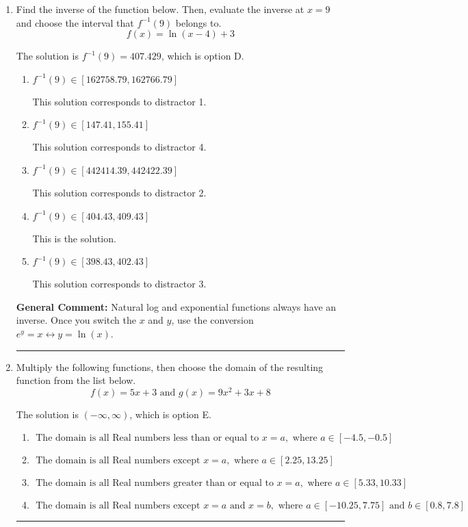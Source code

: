 \documentclass{extbook}[14pt]
\newcommand{\litem}[1]{\item #1

\rule{\textwidth}{0.4pt}}
\begin{document}
\begin{enumerate}\litem{
Find the inverse of the function below. Then, evaluate the inverse at $x = 9$ and choose the interval that $f^{-1}(9)$ belongs to.
\[ f(x) = \ln{(x-4)}+3 \]

The solution is \( f^{-1}(9) = 407.429 \), which is option D.\begin{enumerate}[label=\Alph*.]
\item \( f^{-1}(9) \in [162758.79, 162766.79] \)

 This solution corresponds to distractor 1.
\item \( f^{-1}(9) \in [147.41, 155.41] \)

 This solution corresponds to distractor 4.
\item \( f^{-1}(9) \in [442414.39, 442422.39] \)

 This solution corresponds to distractor 2.
\item \( f^{-1}(9) \in [404.43, 409.43] \)

 This is the solution.
\item \( f^{-1}(9) \in [398.43, 402.43] \)

 This solution corresponds to distractor 3.
\end{enumerate}

\textbf{General Comment:} Natural log and exponential functions always have an inverse. Once you switch the $x$ and $y$, use the conversion $ e^y = x \leftrightarrow y=\ln(x)$.
}
\litem{
Multiply the following functions, then choose the domain of the resulting function from the list below.
\[ f(x) = 5x + 3 \text{ and } g(x) = 9x^{2} +3 x + 8 \]

The solution is \( (-\infty, \infty) \), which is option E.\begin{enumerate}[label=\Alph*.]
\item \( \text{ The domain is all Real numbers less than or equal to } x = a, \text{ where } a \in [-4.5, -0.5] \)


\item \( \text{ The domain is all Real numbers except } x = a, \text{ where } a \in [2.25, 13.25] \)


\item \( \text{ The domain is all Real numbers greater than or equal to } x = a, \text{ where } a \in [5.33, 10.33] \)


\item \( \text{ The domain is all Real numbers except } x = a \text{ and } x = b, \text{ where } a \in [-10.25, 7.75] \text{ and } b \in [0.8, 7.8] \)



\end{enumerate}}
\end{enumerate}
\end{document}
